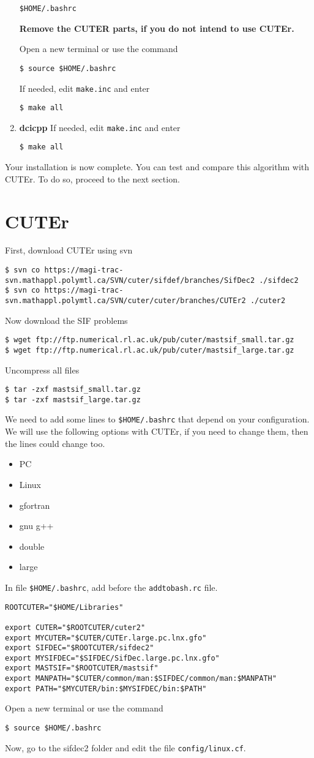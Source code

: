 \documentclass[letterpaper,11pt]{article}
\numberwithin{equation}{section}
\newcommand{\makesec}[1]{\section[#1]{#1}}
\begin{document}
\begin{enumerate}
\verb+$HOME/.bashrc+

{\bf Remove the CUTER parts, if you do not intend to use CUTEr. }

Open a new terminal or use the command
\begin{verbatim}
$ source $HOME/.bashrc
\end{verbatim}
If needed, edit \verb+make.inc+ and enter
\begin{verbatim}
$ make all
\end{verbatim}
   \item {\bf dcicpp} If needed, edit \verb+make.inc+ and enter
\begin{verbatim}
$ make all
\end{verbatim}
\end{enumerate}

Your installation is now complete. You can test and compare this algorithm with CUTEr. To do so, proceed to the next section.

\makesec{CUTEr}
First, download CUTEr using svn
\small
\begin{verbatim}
$ svn co https://magi-trac-svn.mathappl.polymtl.ca/SVN/cuter/sifdef/branches/SifDec2 ./sifdec2
$ svn co https://magi-trac-svn.mathappl.polymtl.ca/SVN/cuter/cuter/branches/CUTEr2 ./cuter2
\end{verbatim}
\normalsize
Now download the SIF problems
\begin{verbatim}
$ wget ftp://ftp.numerical.rl.ac.uk/pub/cuter/mastsif_small.tar.gz
$ wget ftp://ftp.numerical.rl.ac.uk/pub/cuter/mastsif_large.tar.gz
\end{verbatim}
Uncompress all files
\begin{verbatim}
$ tar -zxf mastsif_small.tar.gz
$ tar -zxf mastsif_large.tar.gz
\end{verbatim}
We need to add some lines to \verb+$HOME/.bashrc+ that depend on your configuration.
We will use the following options with CUTEr, if you need to change them, then the lines could change too. 
\begin{itemize}
\item PC
\item Linux
\item gfortran
\item gnu g++
\item double
\item large
\end{itemize}

In file \verb+$HOME/.bashrc+, add before the \verb+addtobash.rc+ file.
\begin{verbatim}
ROOTCUTER="$HOME/Libraries"

export CUTER="$ROOTCUTER/cuter2"
export MYCUTER="$CUTER/CUTEr.large.pc.lnx.gfo"
export SIFDEC="$ROOTCUTER/sifdec2"
export MYSIFDEC="$SIFDEC/SifDec.large.pc.lnx.gfo"
export MASTSIF="$ROOTCUTER/mastsif"
export MANPATH="$CUTER/common/man:$SIFDEC/common/man:$MANPATH"
export PATH="$MYCUTER/bin:$MYSIFDEC/bin:$PATH"
\end{verbatim}
Open a new terminal or use the command
\begin{verbatim}
$ source $HOME/.bashrc
\end{verbatim}
Now, go to the sifdec2 folder and edit the file \verb+config/linux.cf+.
\end{document}
